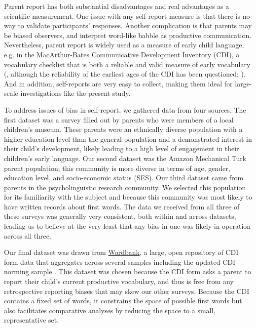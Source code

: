 \documentclass[10pt,letterpaper]{article}
\begin{document}
Parent report has both substantial disadvantages and real advantages as a scientific measurement. One issue with any self-report measure is that there is no way to validate participants' responses. Another complication is that parents may be biased observers, and interpret word-like babble as productive communication. Nevertheless, parent report is widely used as a measure of early child language, e.g. in the MacArthur-Bates Communicative Development Inventory (CDI), a vocabulary checklist that is both a reliable and valid measure of early vocabulary (, although the reliability of the earliest ages of the CDI has been questioned; ). And in addition, self-reports are very easy to collect, making them ideal for large-scale investigations like the present study. 

To address issues of bias in self-report, we gathered data from four sources. The first dataset was a survey filled out by parents who were members of a local children's museum. These parents were an ethnically diverse population with a higher education level than the general population and a demonstrated interest in their child's development, likely leading to a high level of engagement in their children's early language. Our second dataset was the Amazon Mechanical Turk parent population; this community is more diverse in terms of age, gender, education level, and socio-economic status (SES). Our third dataset came from parents in the psycholinguistic research community. We selected this population for its familiarity with the subject and because this community was most likely to have written records about first words. The data we received from all three of these surveys was generally very consistent, both within and across datasets, leading us to believe at the very least that any bias in one was likely in operation across all three. 

Our final dataset was drawn from \href{http://wordbank.stanford.edu}{Wordbank}, a large, open repository of CDI form data that aggregates across several samples including the updated CDI norming sample \cite{fenson2007}. This dataset was chosen because the CDI form asks a parent to report their child's  current productive vocabulary, and thus is free from any retrospective reporting biases that may skew our other surveys. Because the CDI contains a fixed set of words, it constrains the space of possible first words but also facilitates comparative analyses by reducing the space to a small, representative set.
\end{document}

